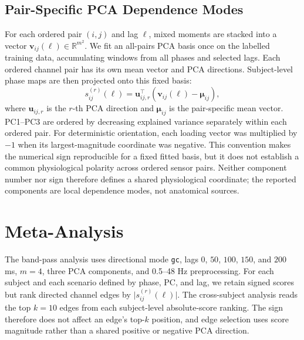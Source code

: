 \documentclass[10pt,journal]{IEEEtran}
\newcommand{\code}[1]{\texttt{#1}}
\newcommand{\vect}[1]{\mathbf{#1}}
\begin{document}
\subsection{Pair-Specific PCA Dependence Modes}
For each ordered pair $(i,j)$ and lag $\ell$, mixed moments are stacked into a vector $\vect{v}_{ij}(\ell)\in\mathbb{R}^{m^2}$. We fit an all-pairs PCA basis once on the labelled training data, accumulating windows from all phases and selected lags. Each ordered channel pair has its own mean vector and PCA directions. Subject-level phase maps are then projected onto this fixed basis:
\begin{equation}
    s_{ij}^{(r)}(\ell)
    =
    \vect{u}_{ij,r}^{\top}\left(\vect{v}_{ij}(\ell)-\boldsymbol{\mu}_{ij}\right),
\end{equation}
where $\vect{u}_{ij,r}$ is the $r$-th PCA direction and $\boldsymbol{\mu}_{ij}$ is the pair-specific mean vector. PC1--PC3 are ordered by decreasing explained variance separately within each ordered pair. For deterministic orientation, each loading vector was multiplied by $-1$ when its largest-magnitude coordinate was negative. This convention makes the numerical sign reproducible for a fixed fitted basis, but it does not establish a common physiological polarity across ordered sensor pairs. Neither component number nor sign therefore defines a shared physiological coordinate; the reported components are local dependence modes, not anatomical sources.

\section{Meta-Analysis}
The band-pass analysis uses directional mode \code{gc}, lags $0$, $50$, $100$, $150$, and $200$ ms, $m=4$, three PCA components, and 0.5--48 Hz preprocessing. For each subject and each scenario defined by phase, PC, and lag, we retain signed scores but rank directed channel edges by $\lvert s_{ij}^{(r)}(\ell)\rvert$. The cross-subject analysis reads the top $k=10$ edges from each subject-level absolute-score ranking. The sign therefore does not affect an edge's top-$k$ position, and edge selection uses score magnitude rather than a shared positive or negative PCA direction.
\end{document}
